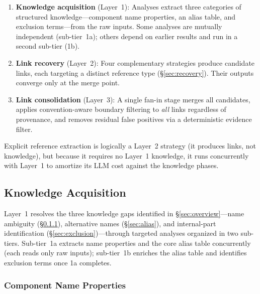 \begin{enumerate}
    \item \textbf{Knowledge acquisition} (Layer~1): Analyses
      extract three categories of structured knowledge---component
      name properties, an alias table, and exclusion terms---from the
      raw inputs.
      Some analyses are mutually independent (sub-tier~1a); others
      depend on earlier results and run in a second sub-tier (1b).
    \item \textbf{Link recovery} (Layer~2): Four complementary
      strategies produce candidate links, each targeting a distinct
      reference type (\S\ref{sec:recovery}). Their outputs converge
      only at the merge point.
    \item \textbf{Link consolidation} (Layer~3): A single fan-in
      stage merges all candidates, applies convention-aware boundary
      filtering to \emph{all} links regardless of provenance, and
      removes residual false positives via a deterministic evidence
      filter.
\end{enumerate}

\noindent Explicit reference extraction is logically a Layer~2
strategy (it produces links, not knowledge), but because it requires
no Layer~1 knowledge, it runs concurrently with Layer~1 to amortize
its LLM cost against the knowledge phases.



\subsection{Knowledge Acquisition}\label{sec:knowledge}

Layer~1 resolves the three knowledge gaps identified in
\S\ref{sec:overview}---name ambiguity (\S\ref{sec:names}),
alternative names (\S\ref{sec:alias}), and internal-part
identification (\S\ref{sec:exclusion})---through targeted analyses
organized in two sub-tiers.
Sub-tier~1a extracts name properties and the core alias table
concurrently (each reads only raw inputs); sub-tier~1b enriches
the alias table and identifies exclusion terms once 1a completes.

\subsubsection{Component Name Properties}\label{sec:names}


